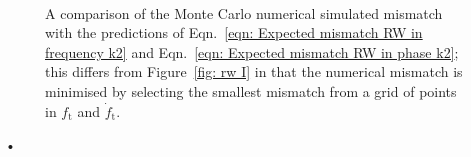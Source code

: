 \begin{figure}[ht]
\centering
{}
\\
\caption{A comparison of the Monte Carlo numerical simulated mismatch with the
predictions of Eqn.~\eqref{eqn: Expected mismatch RW in
frequency k2} and Eqn.~\eqref{eqn: Expected mismatch RW in phase k2}; this differs
from Figure~\ref{fig: rw I} in that the numerical mismatch is minimised by selecting
the smallest mismatch from a grid of points in $f_\textrm{t}$ and $\dot{f}_\textrm{t}$.}
\label{fig: verification of minimised RW}
\end{figure}•
\FloatBarrier
